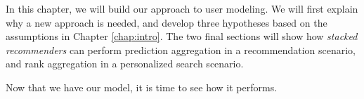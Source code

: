 \label{chap:methods}

In this chapter, we will build our approach to user modeling.
We will first explain why a new approach is needed,
and develop three hypotheses based on the 
assumptions in Chapter \ref{chap:intro}.
The two final sections will show how \emph{stacked recommenders}
can perform prediction aggregation in a recommendation scenario,
and rank aggregation in a personalized search scenario.







Now that we have our model,
it is time to see how it performs.

%
